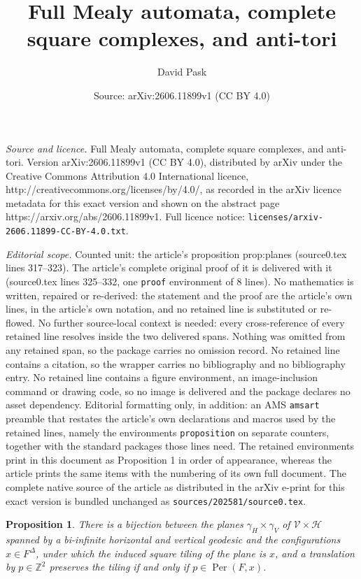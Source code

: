\documentclass[10pt,a4paper]{amsart}
\title{Full Mealy automata, complete square complexes, and anti-tori}
\author{David Pask}
\date{Source: arXiv:2606.11899v1 (CC BY 4.0)}
\newtheorem{proposition}{Proposition}
\newcommand{\Per}{\operatorname{Per}}
\newcommand{\ZZ}{\mathbb{Z}}
\begin{document}
\maketitle

\noindent\emph{Source and licence.} Full Mealy automata, complete square complexes, and anti-tori. Version arXiv:2606.11899v1 (CC BY 4.0), distributed by arXiv under the Creative Commons Attribution 4.0 International licence, http://creativecommons.org/licenses/by/4.0/, as recorded in the arXiv licence metadata for this exact version and shown on the abstract page https://arxiv.org/abs/2606.11899v1. Full licence notice: \texttt{licenses/arxiv-2606.11899-CC-BY-4.0.txt}.\par\smallskip

\noindent\textit{Editorial scope.} Counted unit: the article's proposition prop:planes (source0.tex lines 317--323). The article's complete original proof of it is delivered with it (source0.tex lines 325--332, one \texttt{proof} environment of 8 lines). No mathematics is written, repaired or re-derived: the statement and the proof are the article's own lines, in the article's own notation, and no retained line is substituted or re-flowed.  No further source-local context is needed: every cross-reference of every retained line resolves inside the two delivered spans.  Nothing was omitted from any retained span, so the package carries no omission record.  No retained line contains a citation, so the wrapper carries no bibliography and no bibliography entry.  No retained line contains a figure environment, an image-inclusion command or drawing code, so no image is delivered and the package declares no asset dependency.  Editorial formatting only, in addition: an AMS \texttt{amsart} preamble that restates the article's own declarations and macros used by the retained lines, namely the environments \texttt{proposition} on separate counters, together with the standard packages those lines need.  The retained environments print in this document as Proposition 1 in order of appearance, whereas the article prints the same items with the numbering of its own full document.  The complete native source of the article as distributed in the arXiv e-print for this exact version is bundled unchanged as \texttt{sources/202581/source0.tex}.
\begin{proposition}\label{prop:planes}
There is a bijection between the planes $\gamma_H\times\gamma_V$ of $\mathcal
V\times\mathcal H$ spanned by a bi-infinite horizontal and vertical geodesic and the
configurations $x\in F^\Delta$, under which the induced square tiling of the plane
is $x$, and a translation by $p\in\ZZ^2$ preserves the tiling if and only if
$p\in\Per(F,x)$.
\end{proposition}
\end{document}
